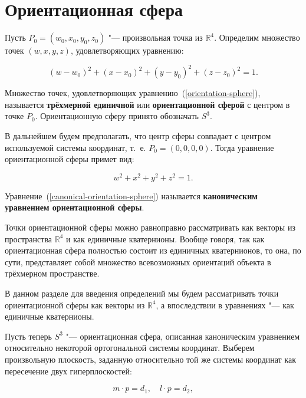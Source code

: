 \section{Ориентационная сфера}

Пусть $P_0=(w_0,x_0,y_0,z_0)$ "--- произвольная точка из $\mathbb{R}^4$. Определим множество точек $(w,x,y,z)$,
удовлетворяющих уравнению:

\begin{equation}
(w-w_0)^2+(x-x_0)^2+(y-y_0)^2+(z-z_0)^2=1.
\label{orientation-sphere}
\end{equation}

\begin{definition}
Множество точек, удовлетворяющих уравнению~(\ref{orientation-sphere}), называется \textbf{трёхмерной единичной} или
\textbf{ориентационной сферой} с центром в точке $P_0$. Ориентационную сферу принято обозначать $S^3$.
\end{definition}

В дальнейшем будем предполагать, что центр сферы совпадает с центром используемой системы координат, т.~е. $P_0=(0,0,
0,0)$. Тогда уравнение ориентационной сферы примет вид:

\begin{equation}
w^2+x^2+y^2+z^2=1.
\label{canonical-orientation-sphere}
\end{equation}

\begin{definition}
Уравнение~(\ref{canonical-orientation-sphere}) называется \textbf{каноническим уравнением ориентационной сферы}.
\end{definition}

Точки ориентационной сферы можно равноправно рассматривать как векторы из пространства $\mathbb{R}^4$ и как единичные
кватернионы. Вообще говоря, так как ориентационная сфера полностью состоит из единичных кватернионов, то она, по
сути, представляет собой множество всевозможных ориентаций объекта в трёхмерном пространстве.

В данном разделе для введения определений мы будем рассматривать точки ориентационной сферы как векторы из
$\mathbb{R}^4$, а впоследствии в уравнениях "--- как единичные кватернионы.

Пусть теперь $S^3$ "--- ориентационная сфера, описанная каноническим уравнением относительно некоторой ортогональной
системы координат. Выберем произвольную плоскость, заданную относительно той же системы координат как пересечение
двух гиперплоскостей:

\begin{equation}
m \cdot p=d_1, \quad l \cdot p=d_2,
\label{hiberplane}
\end{equation}


